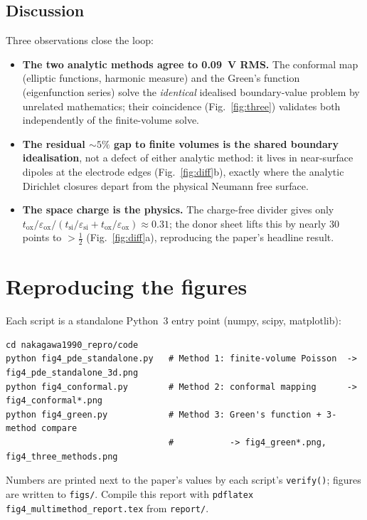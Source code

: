\documentclass[11pt]{article}
\newcommand{\eox}{\varepsilon_{\mathrm{ox}}}
\newcommand{\esi}{\varepsilon_{\mathrm{si}}}
\newcommand{\tox}{t_{\mathrm{ox}}}
\newcommand{\tsi}{t_{\mathrm{si}}}
\begin{document}
\subsection{Discussion}
Three observations close the loop:
\begin{itemize}\itemsep2pt
\item \textbf{The two analytic methods agree to \SI{0.09}{\volt} RMS.} The
conformal map (elliptic functions, harmonic measure) and the Green's function
(eigenfunction series) solve the \emph{identical} idealised boundary-value problem
by unrelated mathematics; their coincidence (Fig.~\ref{fig:three}) validates both
independently of the finite-volume solve.
\item \textbf{The residual $\sim5\%$ gap to finite volumes is the shared boundary
idealisation}, not a defect of either analytic method: it lives in near-surface
dipoles at the electrode edges (Fig.~\ref{fig:diff}b), exactly where the analytic
Dirichlet closures depart from the physical Neumann free surface.
\item \textbf{The space charge is the physics.} The charge-free divider gives only
$t_{\mathrm{ox}}/\eox \big/(\tsi/\esi+\tox/\eox)\approx0.31$; the donor sheet lifts
this by nearly $30$ points to $>\!\tfrac12$ (Fig.~\ref{fig:diff}a), reproducing the
paper's headline result.
\end{itemize}

\section{Reproducing the figures}
Each script is a standalone Python~3 entry point (numpy, scipy, matplotlib):
\begin{lstlisting}
cd nakagawa1990_repro/code
python fig4_pde_standalone.py   # Method 1: finite-volume Poisson  -> fig4_pde_standalone_3d.png
python fig4_conformal.py        # Method 2: conformal mapping      -> fig4_conformal*.png
python fig4_green.py            # Method 3: Green's function + 3-method compare
                                #           -> fig4_green*.png, fig4_three_methods.png
\end{lstlisting}
Numbers are printed next to the paper's values by each script's \texttt{verify()};
figures are written to \texttt{figs/}. Compile this report with
\texttt{pdflatex fig4\_multimethod\_report.tex} from \texttt{report/}.
\end{document}
